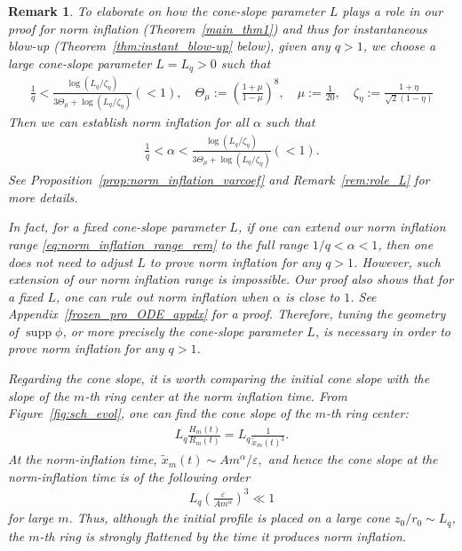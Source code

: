 \documentclass[reqno,11pt]{amsart}
\newtheorem{remark}{Remark}[section]
\newcommand{\supp}{\operatorname{supp}}
\begin{document}
\begin{remark}
To elaborate on how the cone-slope parameter $L$ plays a role in our proof for norm inflation (Theorem~\ref{main_thm1}) and thus for instantaneous blow-up (Theorem~\ref{thm:instant_blow-up} below), 
given any $q>1$, we choose a large cone-slope parameter $L=L_q>0$ such that
    \begin{align}
    \label{eq:cond_L5}
        \frac{1}{q} 
        <
        \frac{\log (L_q/\zeta_\eta)}
        {3\Theta_\mu + \log (L_q/\zeta_\eta)} (<1),
    \quad
        \Theta_\mu:= \left( \frac{1+\mu}{1-\mu} \right)^8,
    \quad \mu:= \frac{1}{20},
    \quad
        \zeta_\eta  := \frac{1+\eta}{\sqrt{2}(1-\eta)}
    \end{align}
Then we can establish norm inflation for all $\alpha$ such that 
    \begin{align}
    \label{eq:norm_inflation_range_rem}
        \frac{1}{q} 
        <\alpha<
        \frac{\log (L_q/\zeta_\eta)}
        {3\Theta_\mu + \log (L_q/\zeta_\eta )} (<1).
    \end{align}
See Proposition~\ref{prop:norm_inflation_varcoef} and Remark~\ref{rem:role_L} for more details.

In fact, for a fixed cone-slope parameter $L$, if one can extend our norm inflation range \eqref{eq:norm_inflation_range_rem} to the full range $1/q<\alpha<1$, then one does not need to adjust $L$ to prove norm inflation for any $q>1$. However, such extension of our norm inflation range is impossible. Our proof also shows that for a fixed $L$, one can rule out norm inflation when $\alpha$ is close to $1$. See Appendix~\ref{frozen_pro_ODE_appdx} for a proof. Therefore, tuning the geometry of $\supp \phi$, or more precisely the cone-slope parameter $L$, is necessary in order to prove norm inflation for any $q>1$.

Regarding the cone slope, it is worth comparing the initial cone slope with the slope of the $m$-th ring center at the norm inflation time. From Figure~\ref{fig:sch_evol}, one can find the cone slope of the $m$-th ring center:
    \begin{align*}
        L_q\frac{H_m(t)}{R_m(t)}=L_q \frac{1}{\tilde x_m(t)^3 }.
    \end{align*}
At the norm-inflation time, $\tilde x_m(t)\sim Am^\alpha /\varepsilon,$ and hence the cone slope at the norm-inflation time is of the following order
    \begin{align*}
        L_q \left( \frac{\varepsilon}{Am^\alpha} \right)^3 \ll 1
    \end{align*}
for large $m$.
Thus, although the initial profile is placed on a large cone \(z_0/r_0\sim L_q\),
the \(m\)-th ring is strongly flattened by the time it produces norm inflation.
\end{remark}
\end{document}
